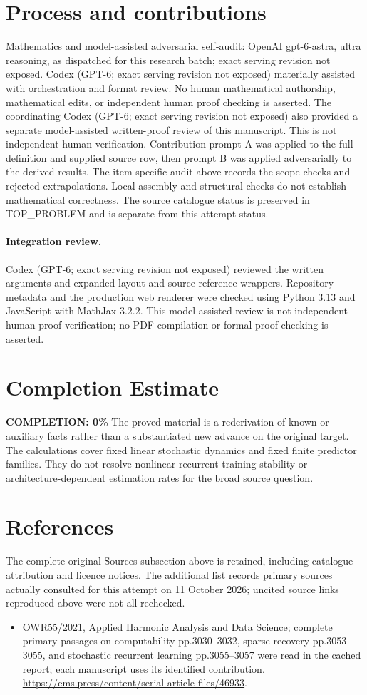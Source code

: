 \documentclass[11pt]{article}
\begin{document}
\section{Process and contributions}
Mathematics and model-assisted adversarial self-audit: OpenAI gpt-6-astra, ultra reasoning, as dispatched for this research batch; exact serving revision not exposed. Codex (GPT-6; exact serving revision not exposed) materially assisted with orchestration and format review. No human mathematical authorship, mathematical edits, or independent human proof checking is asserted.
The coordinating Codex (GPT-6; exact serving revision not exposed) also provided a separate model-assisted written-proof review of this manuscript. This is not independent human verification.
Contribution prompt A was applied to the full definition and supplied source row, then prompt B was applied adversarially to the derived results. The item-specific audit above records the scope checks and rejected extrapolations. Local assembly and structural checks do not establish mathematical correctness. The source catalogue status is preserved in TOP\_PROBLEM and is separate from this attempt status.
\paragraph{Integration review.} Codex (GPT-6; exact serving revision not exposed) reviewed the written arguments and expanded layout and source-reference wrappers. Repository metadata and the production web renderer were checked using Python 3.13 and JavaScript with MathJax 3.2.2. This model-assisted review is not independent human proof verification; no PDF compilation or formal proof checking is asserted.

\section{Completion Estimate}
\noindent\textbf{COMPLETION: 0\%}
The proved material is a rederivation of known or auxiliary facts rather than a substantiated new advance on the original target. The calculations cover fixed linear stochastic dynamics and fixed finite predictor families. They do not resolve nonlinear recurrent training stability or architecture-dependent estimation rates for the broad source question.
\section{References}
The complete original Sources subsection above is retained, including catalogue attribution and licence notices. The additional list records primary sources actually consulted for this attempt on 11 October 2026; uncited source links reproduced above were not all rechecked.
\begin{itemize}
\item OWR55/2021, Applied Harmonic Analysis and Data Science; complete primary passages on computability pp.3030–3032, sparse recovery pp.3053–3055, and stochastic recurrent learning pp.3055–3057 were read in the cached report; each manuscript uses its identified contribution. \url{https://ems.press/content/serial-article-files/46933}.
\end{itemize}
\end{document}
